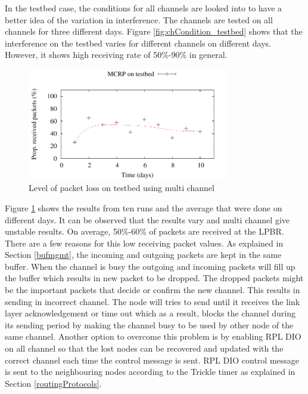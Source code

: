 In the testbed case, the conditions for all channels are looked into to have a better idea of the variation in interference. The channels are tested on all channels for three different days. Figure \ref{fig:chCondition_testbed} shows that the interference on the testbed varies for different channels on different days. However, it shows high receiving rate of 50\%-90\% in general.



\begin{figure}
\centering
\includegraphics[width=0.78\textwidth]{experiments/mct.pdf}
\caption{Level of packet loss on testbed using multi channel}
\label{fig:mcrp_testbed}
\end{figure}

Figure \ref{fig:mcrp_testbed} shows the results from ten runs and the average that were done on different days. It can be observed that the results vary and multi channel give unstable results. On average, 50\%-60\% of packets are received at the LPBR. There are a few reasons for this low receiving packet values. As explained in Section \ref{bufmgmt}, the incoming and outgoing packets are kept in the same buffer. When the channel is busy the outgoing and incoming packets will fill up the buffer which results in new packet to be dropped. The dropped packets might be the important packets that decide or confirm the new channel. This results in sending in incorrect channel. The node will tries to send until it receives the link layer acknowledgement or time out which as a result, blocks the channel during its sending period by making the channel busy to be used by other node of the same channel. Another option to overcome this problem is by enabling RPL DIO on all channel so that the lost nodes can be recovered and updated with the correct channel each time the control message is sent. RPL DIO control message is sent to the neighbouring nodes according to the Trickle timer as explained in Section \ref{routingProtocols}.

